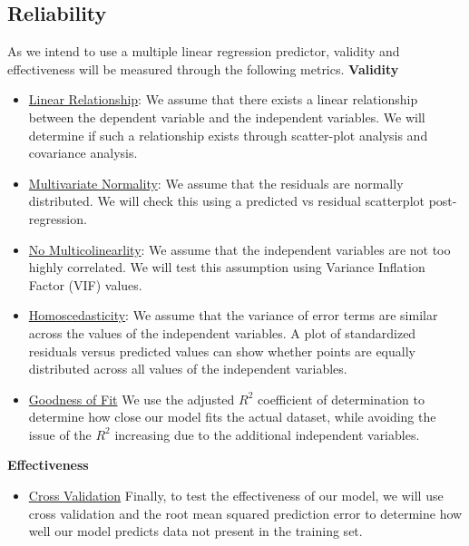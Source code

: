 \documentclass[font=10pt]{article}
\begin{document}
    \subsection{Reliability}
	As we intend to use a multiple linear regression predictor, validity and effectiveness will be measured through the following metrics. 	
	\newline
	\textbf{Validity}
	 \begin{itemize}
        \item \underline{Linear Relationship}: We assume that there exists a linear relationship between the dependent variable and the independent variables. We will determine if such a relationship exists through scatter-plot analysis and covariance analysis.
	 \item \underline{Multivariate Normality}: We assume that the residuals are normally distributed. We will check this using a predicted vs residual scatterplot post-regression.
	 \item \underline{No Multicolinearlity}: We assume that the independent variables are not too highly correlated. We will test this assumption using Variance Inflation Factor (VIF) values.
	\item \underline{Homoscedasticity}: We assume that the variance of error terms are similar across the values of the independent variables.  A plot of standardized residuals versus predicted values can show whether points are equally distributed across all values of the independent variables.
	\item \underline{Goodness of Fit} We use the adjusted $R^{2}$ coefficient of determination to determine how close our model fits the actual dataset, while avoiding the issue of the $R^{2}$ increasing due to the additional independent variables.
	\
      \end{itemize}
	\textbf{Effectiveness}
	\begin{itemize}
	\item \underline{Cross Validation} Finally, to test the effectiveness of our model, we will use cross validation and the root mean squared prediction error to determine how well our model predicts data not present in the training set. 
	\end{itemize}
	
\end{document}
